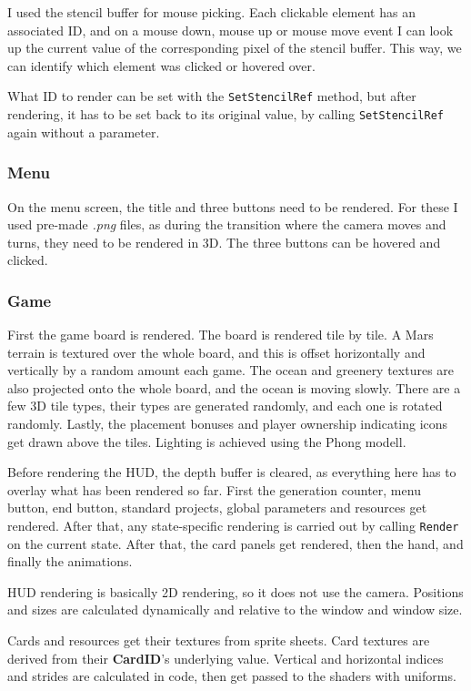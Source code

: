 I used the stencil buffer for mouse picking. Each clickable element has an associated ID, and on a mouse down, mouse up or mouse move event I can look up the current value of the corresponding pixel of the stencil buffer. This way, we can identify which element was clicked or hovered over.

What ID to render can be set with the \texttt{SetStencilRef} method, but after rendering, it has to be set back to its original value, by calling \texttt{SetStencilRef} again without a parameter.

\subsubsection*{Menu}

On the menu screen, the title and three buttons need to be rendered. For these I used pre-made \textit{.png} files, as during the transition where the camera moves and turns, they need to be rendered in 3D. The three buttons can be hovered and clicked.

\subsubsection*{Game}

First the game board is rendered. The board is rendered tile by tile. A Mars terrain is textured over the whole board, and this is offset horizontally and vertically by a random amount each game. The ocean and greenery textures are also projected onto the whole board, and the ocean is moving slowly. There are a few 3D tile types, their types are generated randomly, and each one is rotated randomly. Lastly, the placement bonuses and player ownership indicating icons get drawn above the tiles. Lighting is achieved using the Phong modell\cite{bui1975illumination}.

Before rendering the HUD, the depth buffer is cleared, as everything here has to overlay what has been rendered so far. First the generation counter, menu button, end button, standard projects, global parameters and resources get rendered. After that, any state-specific rendering is carried out by calling \texttt{Render} on the current state. After that, the card panels get rendered, then the hand, and finally the animations.

HUD rendering is basically 2D rendering, so it does not use the camera. Positions and sizes are calculated dynamically and relative to the window and window size.

Cards and resources get their textures from sprite sheets. Card textures are derived from their \textbf{CardID}'s underlying value. Vertical and horizontal indices and strides are calculated in code, then get passed to the shaders with uniforms.

